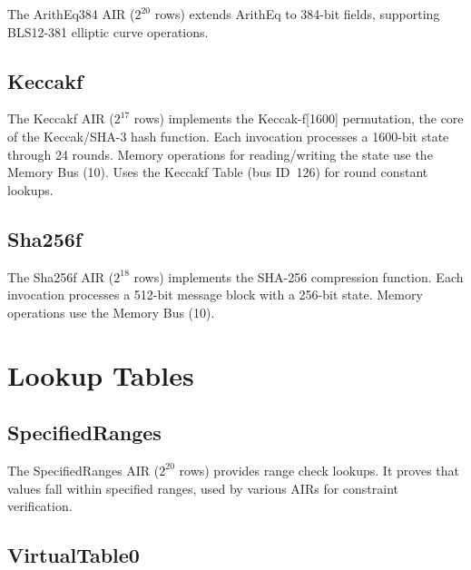 The ArithEq384 AIR ($2^{20}$ rows) extends ArithEq to 384-bit fields,
supporting BLS12-381 elliptic curve operations.

\subsection{Keccakf}
\label{sec:keccakf}

The Keccakf AIR ($2^{17}$ rows) implements the Keccak-f[1600] permutation,
the core of the Keccak/SHA-3 hash function.
Each invocation processes a 1600-bit state through 24 rounds.
Memory operations for reading/writing the state use the Memory Bus (10).
Uses the Keccakf Table (bus ID~126) for round constant lookups.

\subsection{Sha256f}
\label{sec:sha256f}

The Sha256f AIR ($2^{18}$ rows) implements the SHA-256 compression function.
Each invocation processes a 512-bit message block with a 256-bit state.
Memory operations use the Memory Bus (10).

\section{Lookup Tables}
\label{sec:tables}

\subsection{SpecifiedRanges}
\label{sec:specified-ranges}

The SpecifiedRanges AIR ($2^{20}$ rows) provides range check lookups.
It proves that values fall within specified ranges,
used by various AIRs for constraint verification.

\subsection{VirtualTable0}
\label{sec:vt0}

